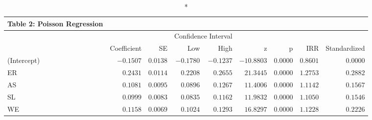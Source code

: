 \begin{longtable}{l|rrrrrrrr}
\caption*{
{\large Table 2: Poisson Regression}
} \\ 
\toprule
\multicolumn{1}{l}{} &  &  & \multicolumn{2}{c}{Confidence Interval} &  &  &  &  \\ 
\cmidrule(lr){4-5}
\multicolumn{1}{l}{} & Coefficient & SE & Low & High & z & p & IRR & Standardized \\ 
\midrule
(Intercept) & $-0.1507$ & $0.0138$ & $-0.1780$ & $-0.1237$ & $-10.8803$ & $0.0000$ & $0.8601$ & $0.0000$ \\ 
ER & $0.2431$ & $0.0114$ & $0.2208$ & $0.2655$ & $21.3445$ & $0.0000$ & $1.2753$ & $0.2882$ \\ 
AS & $0.1081$ & $0.0095$ & $0.0896$ & $0.1267$ & $11.4006$ & $0.0000$ & $1.1142$ & $0.1567$ \\ 
SL & $0.0999$ & $0.0083$ & $0.0835$ & $0.1162$ & $11.9832$ & $0.0000$ & $1.1050$ & $0.1546$ \\ 
WE & $0.1158$ & $0.0069$ & $0.1024$ & $0.1293$ & $16.8297$ & $0.0000$ & $1.1228$ & $0.2226$ \\ 
\bottomrule
\end{longtable}

